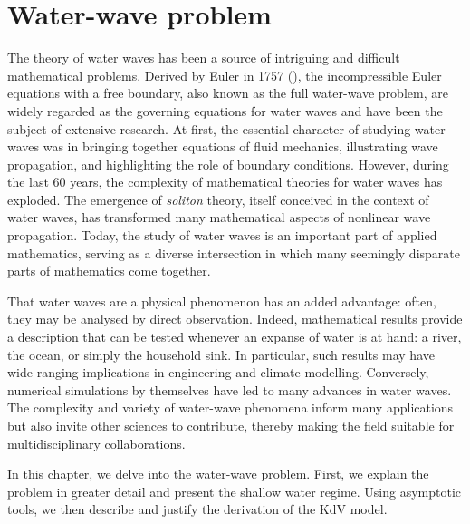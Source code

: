 
\chapter{Water-wave problem} %

\label{chapter3} %


The theory of water waves has been a source of intriguing and difficult mathematical problems. Derived by Euler in 1757 (\cite{C2004}), the incompressible Euler equations with a free boundary, also known as the full water-wave problem, are widely regarded as the governing equations for water waves and have been the subject of extensive research. At first, the essential character of studying water waves was in bringing together equations of fluid mechanics, illustrating wave propagation, and highlighting the role of boundary conditions. However, during the last 60 years, the complexity of mathematical theories for water waves has exploded. The emergence of \textit{soliton} theory, itself conceived in the context of water waves, has transformed many mathematical aspects of nonlinear wave propagation. Today, the study of water waves is an important part of applied mathematics, serving as a diverse intersection in which many seemingly disparate parts of mathematics come together.

That water waves are a physical phenomenon has an added advantage: often, they may be analysed by direct observation. Indeed, mathematical results provide a description that can be tested whenever an expanse of water is at hand: a river, the ocean, or simply the household sink. In particular, such results may have wide-ranging implications in engineering and climate modelling. Conversely, numerical simulations by themselves have led to many advances in water waves. The complexity and variety of water-wave phenomena inform many applications but also invite other sciences to contribute, thereby making  the field suitable for multidisciplinary collaborations.

In this chapter, we delve into the water-wave problem. First, we explain the problem in greater detail and present the shallow water regime. Using asymptotic tools, we then describe and justify the derivation of the KdV model.

